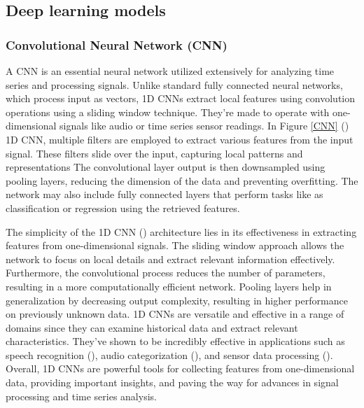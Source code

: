 \documentclass[a4paper,fleqn]{cas-dc}
\begin{document}
\subsection{Deep learning models}
\subsubsection{Convolutional Neural Network (CNN)}
A CNN is an essential neural network utilized extensively for analyzing time series and processing signals. Unlike standard fully connected neural networks, which process input as vectors, 1D CNNs extract local features using convolution operations using a sliding window technique. They're made to operate with one-dimensional signals like audio or time series sensor readings. In Figure \ref{CNN} (\cite{chaerun2021comparative}) 1D CNN, multiple filters are employed to extract various features from the input signal. These filters slide over the input, capturing local patterns and representations The convolutional layer output is then downsampled using pooling layers, reducing the dimension of the data and preventing overfitting. The network may also include fully connected layers that perform tasks like as classification or regression using the retrieved features.

The simplicity of the 1D CNN (\cite{kiranyaz20211d}) architecture lies in its effectiveness in extracting features from one-dimensional signals. The sliding window approach allows the network to focus on local details and extract relevant information effectively. Furthermore, the convolutional process reduces the number of parameters, resulting in a more computationally efficient network. Pooling layers help in generalization by decreasing output complexity, resulting in higher performance on previously unknown data. 1D CNNs are versatile and effective in a range of domains since they can examine historical data and extract relevant characteristics. They've shown to be incredibly effective in applications such as speech recognition (\cite{rusnac2022cnn,wang2019end}), audio categorization (\cite{ashraf2022role,hu2020device}), and sensor data processing (\cite{kattenborn2021review,sun2019classification}). Overall, 1D CNNs are powerful tools for collecting features from one-dimensional data, providing important insights, and paving the way for advances in signal processing and time series analysis.
\end{document}
